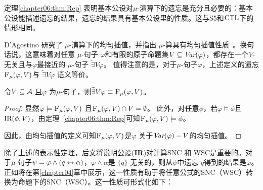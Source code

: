 定理\ref{chapter06:thm:Rep} 表明基本公设对$\mu$-演算下的遗忘是充分且必要的：基本公设能描述遗忘的结果，遗忘的结果具有基本公设里的性质。这与S5和$\textrm{CTL}$下的情形相同。

D'Agostino 研究了 $\mu$-演算下的均匀插值，并指出 $\mu$-算具有均匀插值性质~\cite{d1996uniform,d2000logical,d2006modal}。换句话说，这意味着对任意 $\mu$-句子 $\varphi$和有限的原子命题集$V\subseteq \textit{Var}(\varphi)$，都存在一个$V$-无关且与$\varphi$最接近的 $\mu$-句子 $\widetilde{\exists}V \varphi$。
值得注意的是，对于$\mu$-句子$\varphi$，上述定义的遗忘 ${\textsc{F}_{\textsc{$\mu$}}}(\varphi, V)$与 $\widetilde{\exists}V \varphi$\cite{d2006modal} 语义等价。

\begin{corollary}\label{cor:unifeqforget}
	令$V \subseteq {\cal A}$ 且$\varphi$ 为$\mu$-句子，则$\widetilde{\exists}V \varphi \equiv {\textsc{F}_{\textsc{$\mu$}}}(\varphi, V)$。
\end{corollary}
\begin{proof}
	显然$\varphi \models {\textsc{F}_{\textsc{$\mu$}}}(\varphi, V)$ 且${\textsc{F}_{\textsc{$\mu$}}}(\varphi, V) \cap V = \emptyset$。
	此外，对任意$\phi$，若$\varphi \models \phi$且$\textrm{IR}(\phi, V)$，由定理~\ref{chapter06:thm:Rep}可知${\textsc{F}_{\textsc{$\mu$}}}(\varphi, V) \models \phi$。 
	
	因此，由均匀插值的定义可知${\textsc{F}_{\textsc{$\mu$}}}(\varphi, V)$是$\varphi$ 关于$\textit{Var}(\varphi)-V$的均匀插值。 
\end{proof}

除了上述的表示性定理，后文将说明公设(\textbf{IR})对计算SNC 和 WSC是重要的。对于$\mu$-句子$\psi = \varphi \wedge (q \leftrightarrow \alpha)$，$\varphi \wedge \alpha$是 $\{q\}$-无关的，则从$\psi$中遗忘 $q$得到的结果是$\varphi$。正如将在第\ref{chapter04}章中展示，这一性质有助于将任意公式的SNC（WSC）转换为命题下的SNC（WSC）。这一性质可形式化如下：

